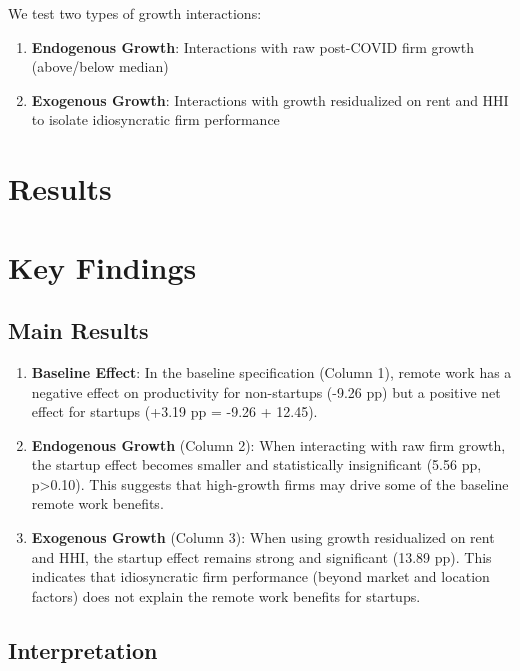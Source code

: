 \documentclass[11pt]{article}
\begin{document}
We test two types of growth interactions:
\begin{enumerate}
\item \textbf{Endogenous Growth}: Interactions with raw post-COVID firm growth (above/below median)
\item \textbf{Exogenous Growth}: Interactions with growth residualized on rent and HHI to isolate idiosyncratic firm performance
\end{enumerate}

\section{Results}



\section{Key Findings}

\subsection{Main Results}

\begin{enumerate}
\item \textbf{Baseline Effect}: In the baseline specification (Column 1), remote work has a negative effect on productivity for non-startups (-9.26 pp) but a positive net effect for startups (+3.19 pp = -9.26 + 12.45).

\item \textbf{Endogenous Growth} (Column 2): When interacting with raw firm growth, the startup effect becomes smaller and statistically insignificant (5.56 pp, p>0.10). This suggests that high-growth firms may drive some of the baseline remote work benefits.

\item \textbf{Exogenous Growth} (Column 3): When using growth residualized on rent and HHI, the startup effect remains strong and significant (13.89 pp). This indicates that idiosyncratic firm performance (beyond market and location factors) does not explain the remote work benefits for startups.
\end{enumerate}

\subsection{Interpretation}
\end{document}
